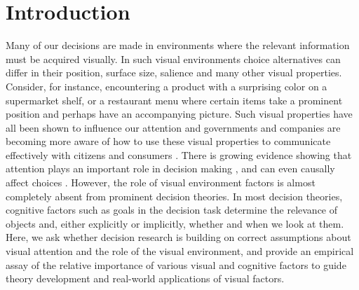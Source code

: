 
\section{Introduction}

Many of our decisions are made in environments where the relevant information must be acquired visually. In such visual environments choice alternatives can differ in their position, surface size, salience and many other visual properties. Consider, for instance, encountering a product with a surprising color on a supermarket shelf, or a restaurant menu where certain items take a prominent position and perhaps have an accompanying picture. Such visual properties have all been shown to influence our attention \citep{corbetta2002a,borji2012a,dehaene2003a,clarke2014a, rosenholtz2007a} and governments and companies are becoming more aware of how to use these visual properties to communicate effectively with citizens and consumers \citep{orquinwedel2020}. There is growing evidence showing that attention plays an important role in decision making \citep{gidloef2017a,krajbich2010a, stojic2020uncertainty, callaway2019a, gluth2018, gluth2020}, and can even causally affect choices \citep{ghaffari2018a, paernamets2015a, shimojo2003a}. However, the role of visual environment factors is almost completely absent from prominent decision theories.  In most decision theories, cognitive factors such as goals in the decision task determine the relevance of objects and, either explicitly or implicitly, whether and when we look at them. Here, we ask whether decision research is building on correct assumptions about visual attention and the role of the visual environment, and provide an empirical assay of the relative importance of various visual and cognitive factors to guide theory development and real-world applications of visual factors.\\

